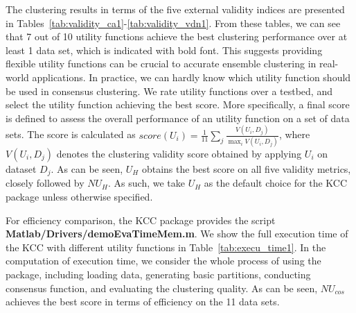 \documentclass[10pt]{acmtrans2e}
\newcommand{\package}[1]{\textsf{#1}\xspace} %
\begin{document}
The clustering results in terms of the five external validity indices are presented in Tables~\ref{tab:validity_ca1}-\ref{tab:validity_vdn1}. From these tables, we can see that 7 out of 10 utility functions achieve the best clustering performance over at least 1 data set, which is indicated with bold font. This suggests providing flexible utility functions can be crucial to accurate ensemble clustering in real-world applications. In practice, we can hardly know which utility function should be used in consensus clustering. We rate utility functions over a testbed, and select the utility function achieving the best score. More specifically, a final score is defined to assess the overall performance of an utility function on a set of data sets. The score is calculated as $score(U_i)=\frac{1}{11}\sum_j \frac{V(U_i,D_j)}{\max_i V(U_i, D_j)}$, where $V(U_i,D_j)$ denotes the clustering validity score obtained by applying $U_i$ on dataset $D_j$. As can be seen, $U_H$ obtains the best score on all five validity metrics, closely followed by $NU_{H}$. As such, we take $U_H$ as the default choice for the \package{KCC} package unless otherwise specified.

For efficiency comparison, the \package{KCC} package provides the script \textbf{Matlab/Drivers/demoEvaTimeMem.m}. We show the full execution time of the \package{KCC} with different utility functions in Table~\ref{tab:execu_time1}. In the computation of execution time, we consider the whole process of using the package, including loading data, generating basic partitions, conducting consensus function, and evaluating the clustering quality. As can be seen, $NU_{cos}$ achieves the best score in terms of efficiency on the 11 data sets.
\end{document}
